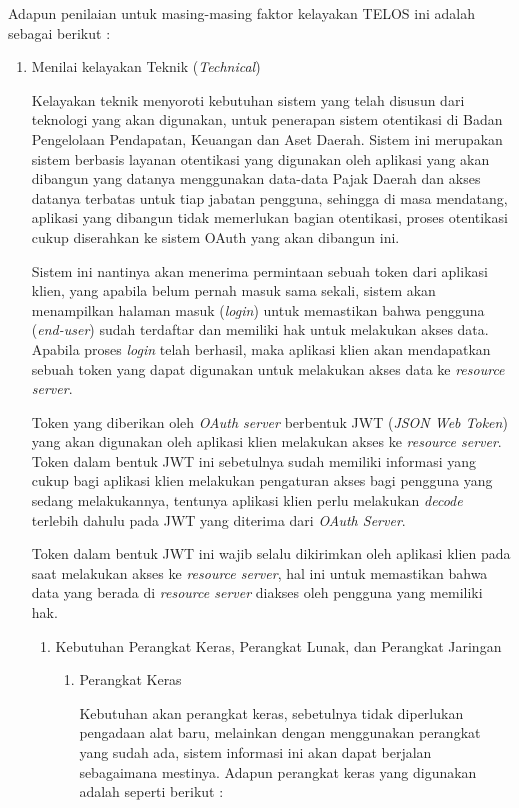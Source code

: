 \documentclass[pdftex,12pt, oneside]{article}
\begin{document}
Adapun penilaian untuk masing-masing faktor kelayakan TELOS ini adalah sebagai berikut :

\begin{enumerate}
	\item Menilai kelayakan Teknik (\textit{Technical})
	
Kelayakan teknik menyoroti kebutuhan sistem yang telah disusun dari teknologi yang akan digunakan, untuk penerapan sistem otentikasi di Badan Pengelolaan Pendapatan, Keuangan dan Aset Daerah. Sistem ini merupakan sistem berbasis layanan otentikasi yang digunakan oleh aplikasi yang akan dibangun yang datanya menggunakan data-data Pajak Daerah dan akses datanya terbatas untuk tiap jabatan pengguna, sehingga di masa mendatang, aplikasi yang dibangun tidak memerlukan bagian otentikasi, proses otentikasi cukup diserahkan ke sistem OAuth yang akan dibangun ini.

Sistem ini nantinya akan menerima permintaan sebuah token dari aplikasi klien, yang apabila belum pernah masuk sama sekali, sistem akan menampilkan halaman masuk (\textit{login}) untuk memastikan bahwa pengguna (\textit{end-user}) sudah terdaftar dan memiliki hak untuk melakukan akses data. Apabila proses \textit{login} telah berhasil, maka aplikasi klien akan mendapatkan sebuah token yang dapat digunakan untuk melakukan akses data ke \textit{resource server}.

Token yang diberikan oleh \textit{OAuth server} berbentuk JWT (\textit{JSON Web Token}) yang akan digunakan oleh aplikasi klien melakukan akses ke \textit{resource server}. Token dalam bentuk JWT ini sebetulnya sudah memiliki informasi yang cukup bagi aplikasi klien melakukan pengaturan akses bagi pengguna yang sedang melakukannya, tentunya aplikasi klien perlu melakukan \textit{decode} terlebih dahulu pada JWT yang diterima dari \textit{OAuth Server}.

Token dalam bentuk JWT ini wajib selalu dikirimkan oleh aplikasi klien pada saat melakukan akses ke \textit{resource server}, hal ini untuk memastikan bahwa data yang berada di \textit{resource server} diakses oleh pengguna yang memiliki hak.

\begin{enumerate}
	\item Kebutuhan Perangkat Keras, Perangkat Lunak, dan Perangkat Jaringan
	
\begin{enumerate}
	\item Perangkat Keras
	
Kebutuhan akan perangkat keras, sebetulnya tidak diperlukan pengadaan alat baru, melainkan dengan menggunakan perangkat yang sudah ada, sistem informasi ini akan dapat berjalan sebagaimana mestinya. Adapun perangkat keras yang digunakan adalah seperti berikut :


\end{enumerate}
\end{enumerate}
\end{enumerate}
\end{document}
